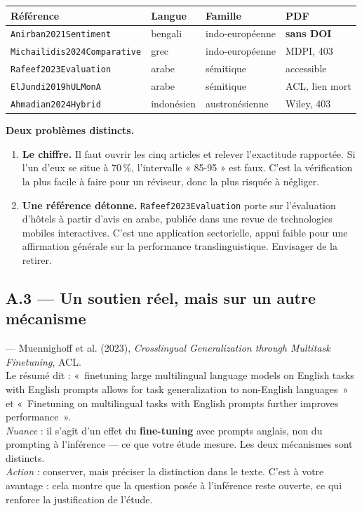 \documentclass[11pt,a4paper]{article}
\newcommand{\att}{\textcolor{warn}{\textbf{!}}}
\newcommand{\cle}[1]{\texttt{\small #1}}
\begin{document}
\begin{center}
\begin{tabular}{@{}llll@{}}
\toprule
\textbf{Référence} & \textbf{Langue} & \textbf{Famille} & \textbf{PDF} \\
\midrule
\cle{Anirban2021Sentiment}      & bengali    & indo-européenne & \textbf{sans DOI} \\
\cle{Michailidis2024Comparative} & grec       & indo-européenne & MDPI, 403 \\
\cle{Rafeef2023Evaluation}       & arabe      & sémitique       & accessible \\
\cle{ElJundi2019hULMonA}         & arabe      & sémitique       & ACL, lien mort \\
\cle{Ahmadian2024Hybrid}         & indonésien & austronésienne  & Wiley, 403 \\
\bottomrule
\end{tabular}
\end{center}

\medskip
\noindent\textbf{Deux problèmes distincts.}

\begin{enumerate}
\item \textbf{Le chiffre.} Il faut ouvrir les cinq articles et relever
l'exactitude rapportée. Si l'un d'eux se situe à 70\,\%, l'intervalle « 85-95 »
est faux. C'est la vérification la plus facile à faire pour un réviseur, donc
la plus risquée à négliger.

\item \textbf{Une référence détonne.} \cle{Rafeef2023Evaluation} porte sur
l'évaluation d'hôtels à partir d'avis en arabe, publiée dans une revue de
technologies mobiles interactives. C'est une application sectorielle, appui
faible pour une affirmation générale sur la performance translinguistique.
Envisager de la retirer.
\end{enumerate}

\subsection*{A.3 --- Un soutien réel, mais sur un autre mécanisme}

\begin{description}[leftmargin=0pt,style=unboxed]
\item[\att~\cle{Muennighoff2023Crosslingual}] --- Muennighoff et al. (2023),
\emph{Crosslingual Generalization through Multitask Finetuning}, ACL.\\
Le résumé dit : «~finetuning large multilingual language models on English tasks
with English prompts allows for task generalization to non-English languages~»
et «~Finetuning on multilingual tasks with English prompts further improves
performance~».\\
\textit{Nuance} : il s'agit d'un effet du \textbf{fine-tuning} avec prompts
anglais, non du prompting à l'inférence --- ce que votre étude mesure. Les deux
mécanismes sont distincts.\\
\textit{Action} : conserver, mais préciser la distinction dans le texte. C'est à
votre avantage : cela montre que la question posée à l'inférence reste ouverte,
ce qui renforce la justification de l'étude.
\end{description}
\end{document}

